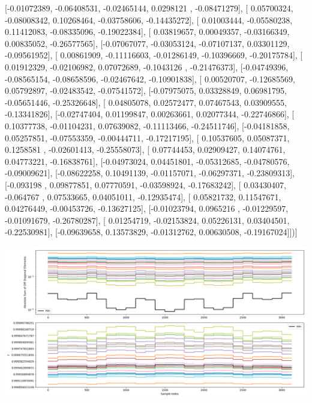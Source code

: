 \documentclass{article}
\begin{document}
       [-0.01072389, -0.06408531, -0.02465144,  0.0298121 , -0.08471279],
       [ 0.05700324, -0.08008342,  0.10268464, -0.03758606, -0.14435272],
       [ 0.01003444, -0.05580238,  0.11412083, -0.08335096, -0.19022384],
       [ 0.03819657,  0.00049357, -0.03166349,  0.00835052, -0.26577565],
       [-0.07067077, -0.03053124, -0.07107137,  0.03301129, -0.09561952],
       [ 0.00861909, -0.11116603, -0.01286149, -0.10396669, -0.20175784],
       [ 0.01912329, -0.02106982,  0.07072689, -0.1043126 , -0.21476373],
       [-0.04749396, -0.08565154, -0.08658596, -0.02467642, -0.10901838],
       [ 0.00520707, -0.12685569,  0.05792897, -0.02483542, -0.07541572],
       [-0.07975075,  0.03328849,  0.06981795, -0.05651446, -0.25326648],
       [ 0.04805078,  0.02572477,  0.07467543,  0.03909555, -0.13341826],
       [-0.02747404,  0.01199847,  0.00263661,  0.02077344, -0.22746866],
       [ 0.10377738, -0.01104231,  0.07639082, -0.11113466, -0.24511746],
       [-0.04181858,  0.05257851, -0.07553359, -0.00444711, -0.17217195],
       [ 0.10537605,  0.05087371,  0.1258581 , -0.02601413, -0.25558073],
       [ 0.07744453,  0.02909427,  0.14074761,  0.04773221, -0.16838761],
       [-0.04973024,  0.04451801, -0.05312685, -0.04780576, -0.09009621],
       [-0.08622258,  0.10491139, -0.01157071, -0.06297371, -0.23809313],
       [-0.093198  ,  0.09877851,  0.07770591, -0.03598924, -0.17683242],
       [ 0.03430407, -0.064767  ,  0.07533665,  0.04051011, -0.12935474],
       [ 0.05821732,  0.11547671,  0.04276449, -0.00453726, -0.13627125],
       [-0.01023794,  0.0965216 , -0.01229597, -0.01091679, -0.26780287],
       [ 0.01254719, -0.02153824,  0.05226131,  0.03404501, -0.22530981],
       [-0.09639658,  0.13573829, -0.01312762,  0.00630508, -0.19167024]])]
\begin{center}
\includegraphics[scale=.9]{report_pickled_controls255/control_dpn_all.png}

\end{center}
\end{document}
